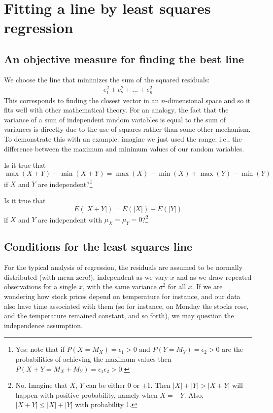 \section{Fitting a line by least squares regression}
\label{fittingALineByLSR}



\subsection{An objective measure for finding the best line}

We choose the line that minimizes the sum of the squared residuals:
\begin{eqnarray}
e_{1}^2 + e_{2}^2 + \dots + e_{n}^2
\label{sumOfSquaresForResiduals}
\end{eqnarray}
This corresponds to finding the closest vector in an $n$-dimensional space and so it fits well with other mathematical theory. For an analogy, the fact that the variance of a sum of independent random variables is equal to the sum of variances is directly due to the use of squares rather than some other mechanism. To demonstrate this with an example: imagine we just used the range, i.e., the difference between the maximum and minimum values of our random variables.
\begin{exercise}
	Is it true that
	\[
		\max(X+Y)-\min(X+Y)=\max(X)-\min(X)+\max(Y)-\min(Y)
	\]
	if $X$ and $Y$ are independent?\footnote{Yes: note that if $P(X=M_X)=\epsilon_1>0$ and $P(Y=M_Y)=\epsilon_2>0$ are the probabilities of achieving the maximum values then $P(X+Y=M_X+M_Y)=\epsilon_1\epsilon_2>0$.}
\end{exercise}
\begin{exercise}
	Is it true that
	\[
		E(|X+Y|)=E(|X|) + E(|Y|)
	\]
	if $X$ and $Y$ are independent with $\mu_X=\mu_Y=0$?\footnote{No. Imagine that $X$, $Y$ can be either 0 or $\pm 1$. Then $|X|+|Y|>|X+Y|$ will happen with positive probability, namely when $X=-Y$. Also, $|X+Y|\le |X|+|Y|$ with probability 1.}
\end{exercise}

\subsection{Conditions for the least squares line}

For the typical analysis of regression, the residuals are assumed to be normally distributed (with mean zero!), independent as we vary $x$ and as we draw repeated observations for a single $x$, with the same variance $\sigma^2$ for all $x$. If we are wondering how stock prices depend on temperature for instance, and our data also have time associated with them (so for instance, on Monday the stocks rose, and the temperature remained constant, and so forth), we may question the independence assumption.




